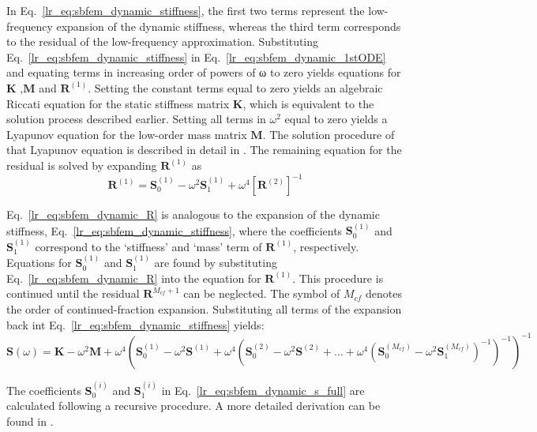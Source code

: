In Eq.~\ref{lr_eq:sbfem_dynamic_stiffness}, the first two terms represent the low-frequency expansion of the dynamic stiffness, whereas the third term corresponds to the residual of the low-frequency approximation.
Substituting Eq.~\ref{lr_eq:sbfem_dynamic_stiffness} in Eq.~\ref{lr_eq:sbfem_dynamic_1stODE} and equating terms in increasing order of powers of ω to zero yields equations for $\mathbf{K}$ ,$\mathbf{M}$  and $\mathbf{R}^{(1)}$.
Setting the constant terms equal to zero yields an algebraic Riccati equation for the static stiffness matrix $\mathbf{K}$, which is equivalent to the solution process described earlier.
Setting all terms in $\omega^2$ equal to zero yields a Lyapunov equation for the low-order mass matrix $\mathbf{M}$.
The solution procedure of that Lyapunov equation is described in detail in \cite{Son1997}.
The remaining equation for the residual is solved by expanding  $\mathbf{R}^{(1)}$ as
\begin{equation}
    \mathbf{R}^{(1)} = \mathbf{S}_0^{(1)} - \omega^2 \mathbf{S}_1^{(1)} + \omega^4 [\mathbf{R}^{(2)}]^{-1}
    \label{lr_eq:sbfem_dynamic_R}
\end{equation}

Eq.~\ref{lr_eq:sbfem_dynamic_R} is analogous to the expansion of the dynamic stiffness, Eq.~\ref{lr_eq:sbfem_dynamic_stiffness}, where the coefficients $\mathbf{S}^{(1)}_0$ and $\mathbf{S}^{(1)}_1$ correspond to the `stiffness' and `mass' term of $\mathbf{R}^{(1)}$, respectively.
Equations for $\mathbf{S}^{(1)}_0$ and $\mathbf{S}^{(1)}_1$ are found by substituting Eq.~\ref{lr_eq:sbfem_dynamic_R} into the equation for $\mathbf{R}^{(1)}$.
This procedure is continued until the residual $\mathbf{R}^{M_{cf}+1}$ can be neglected.
The symbol of $M_{cf}$ denotes the order of continued-fraction expansion.
Substituting all terms of the expansion back int Eq.~\ref{lr_eq:sbfem_dynamic_stiffness} yields:
\begin{dmath}
    \mathbf{S}(\omega) =    \mathbf{K} - \omega^2 \mathbf{M} + \omega^4 \left(
                                \mathbf{S}_0^{(1)} - \omega^2 \mathbf{S}^{(1)} + \omega^4 \left(
                                    \mathbf{S}_0^{(2)} - \omega^2 \mathbf{S}^{(2)} + \dots + 
                                    \omega^4 \left(
                                        \mathbf{S}_0^{(M_{cf})} - \omega^2 \mathbf{S}_1^{(M_{cf})}
                                    \right)^{-1}
                                \right)^{-1}
                            \right)^{-1}
\label{lr_eq:sbfem_dynamic_s_full}
\end{dmath}

The coefficients $\mathbf{S}^{(i)}_0$ and $\mathbf{S}^{(i)}_1$ in Eq.~\ref{lr_eq:sbfem_dynamic_s_full} are calculated following a recursive procedure.
A more detailed derivation can be found in \cite{Song2009}.
